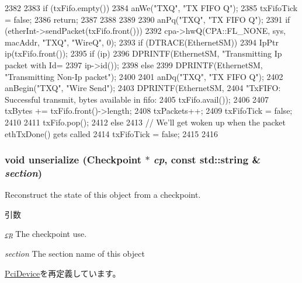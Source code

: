 \begin{DoxyCode}
2382 {
2383     if (txFifo.empty()) {
2384         anWe("TXQ", "TX FIFO Q");
2385         txFifoTick = false;
2386         return;
2387     }
2388 
2389 
2390     anPq("TXQ", "TX FIFO Q");
2391     if (etherInt->sendPacket(txFifo.front())) {
2392         cpa->hwQ(CPA::FL_NONE, sys, macAddr, "TXQ", "WireQ", 0);
2393         if (DTRACE(EthernetSM)) {
2394             IpPtr ip(txFifo.front());
2395             if (ip)
2396                 DPRINTF(EthernetSM, "Transmitting Ip packet with Id=%
2397                         ip->id());
2398             else
2399                 DPRINTF(EthernetSM, "Transmitting Non-Ip packet\n");
2400         }
2401         anDq("TXQ", "TX FIFO Q");
2402         anBegin("TXQ", "Wire Send");
2403         DPRINTF(EthernetSM,
2404                 "TxFIFO: Successful transmit, bytes available in fifo: %
2405                 txFifo.avail());
2406 
2407         txBytes += txFifo.front()->length;
2408         txPackets++;
2409         txFifoTick = false;
2410 
2411         txFifo.pop();
2412     } else {
2413         // We'll get woken up when the packet ethTxDone() gets called
2414         txFifoTick = false;
2415     }
2416 }
\end{DoxyCode}
\hypertarget{classIGbE_af22e5d6d660b97db37003ac61ac4ee49}{
\subsubsection[{unserialize}]{\setlength{\rightskip}{0pt plus 5cm}void unserialize ({\bf Checkpoint} $\ast$ {\em cp}, \/  const std::string \& {\em section})}}
\label{classIGbE_af22e5d6d660b97db37003ac61ac4ee49}
Reconstruct the state of this object from a checkpoint. 
\begin{DoxyParams}{引数}
\item[{\em \hyperlink{namespacecp}{cp}}]The checkpoint use. \item[{\em section}]The section name of this object \end{DoxyParams}


\hyperlink{classPciDevice_af22e5d6d660b97db37003ac61ac4ee49}{PciDevice}を再定義しています。


